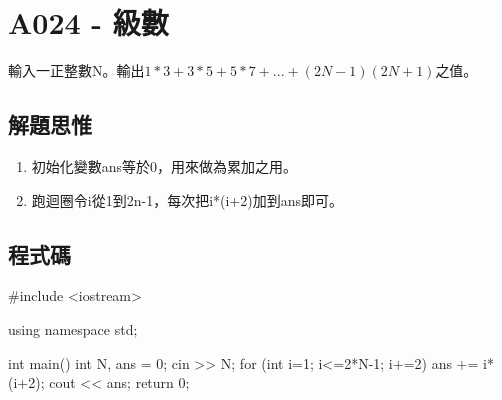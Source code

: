 \section{A024 - 級數}
輸入一正整數N。輸出$1*3+3*5+5*7+...+(2N-1)(2N+1)$之值。

\subsection{解題思惟}
\begin{enumerate}
\item 初始化變數ans等於0，用來做為累加之用。
\item 跑迴圈令i從1到2n-1，每次把i*(i+2)加到ans即可。
\end{enumerate}

\subsection{程式碼}
\begin{cppcode}
#include <iostream>

using namespace std;

int main()
{
	int N, ans = 0;
	cin >> N;
	for (int i=1; i<=2*N-1; i+=2) {
		ans += i*(i+2);
	}
	cout << ans;
	return 0;
}
\end{cppcode}
